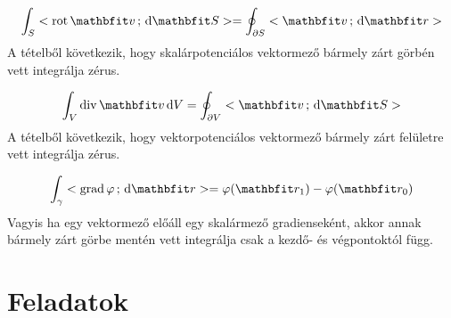 \documentclass[lang=magyar]{math-handout}
\begin{document}
\vfill

\begin{block}
  \[
    \int_S \scalar{\rot \rvec v}{\diff \rvec S}
    =
    \oint_{\partial S} \scalar{\rvec v}{\diff \rvec r}
  \]
  A tételből következik, hogy skalárpotenciálos vektormező bármely zárt görbén
  vett integrálja zérus.

  \[
    \int_V \Div \rvec v \, \diff V
    =
    \oint_{\partial V} \scalar{\rvec v}{\diff \rvec S}
  \]
  A tételből következik, hogy vektorpotenciálos vektormező bármely zárt
  felületre vett integrálja zérus.

  \[
    \int_\gamma \scalar{\grad \varphi}{\diff \rvec r}
    =
    \varphi(\rvec r_1) - \varphi(\rvec r_0)
  \]
  Vagyis ha egy vektormező előáll egy skalármező gradienseként, akkor annak
  bármely zárt görbe mentén vett integrálja csak a kezdő- és végpontoktól függ.
\end{block}

\clearpage

\clearpage
\section{Feladatok}
\end{document}
